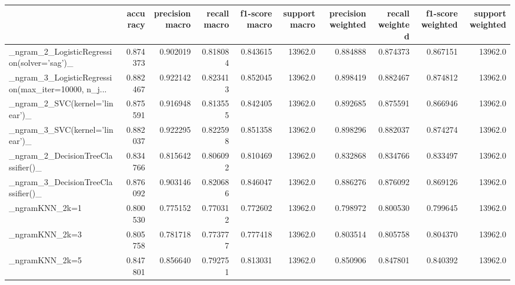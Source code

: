 \begin{tabular}{lrrrrrrrrr}
\toprule
{} &  accuracy &  precision macro &  recall macro &  f1-score macro &  support macro &  precision weighted &  recall weighted &  f1-score weighted &  support weighted \\
\midrule
\_ngram\_2\_LogisticRegression(solver='sag')\_         &  0.874373 &         0.902019 &      0.818084 &        0.843615 &        13962.0 &            0.884888 &         0.874373 &           0.867151 &           13962.0 \\
\_ngram\_3\_LogisticRegression(max\_iter=10000, n\_j... &  0.882467 &         0.922142 &      0.823413 &        0.852045 &        13962.0 &            0.898419 &         0.882467 &           0.874812 &           13962.0 \\
\_ngram\_2\_SVC(kernel='linear')\_                     &  0.875591 &         0.916948 &      0.813555 &        0.842405 &        13962.0 &            0.892685 &         0.875591 &           0.866946 &           13962.0 \\
\_ngram\_3\_SVC(kernel='linear')\_                     &  0.882037 &         0.922295 &      0.822598 &        0.851358 &        13962.0 &            0.898296 &         0.882037 &           0.874274 &           13962.0 \\
\_ngram\_2\_DecisionTreeClassifier()\_                 &  0.834766 &         0.815642 &      0.806092 &        0.810469 &        13962.0 &            0.832868 &         0.834766 &           0.833497 &           13962.0 \\
\_ngram\_3\_DecisionTreeClassifier()\_                 &  0.876092 &         0.903146 &      0.820686 &        0.846047 &        13962.0 &            0.886276 &         0.876092 &           0.869126 &           13962.0 \\
\_ngramKNN\_2k=1                                     &  0.800530 &         0.775152 &      0.770312 &        0.772602 &        13962.0 &            0.798972 &         0.800530 &           0.799645 &           13962.0 \\
\_ngramKNN\_2k=3                                     &  0.805758 &         0.781718 &      0.773777 &        0.777418 &        13962.0 &            0.803514 &         0.805758 &           0.804370 &           13962.0 \\
\_ngramKNN\_2k=5                                     &  0.847801 &         0.856640 &      0.792751 &        0.813031 &        13962.0 &            0.850906 &         0.847801 &           0.840392 &           13962.0 \\

\end{tabular}
